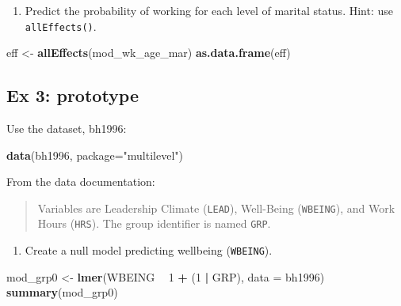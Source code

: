 \documentclass[]{book}
\newenvironment{Shaded}{\begin{snugshade}}{\end{snugshade}}
\newcommand{\KeywordTok}[1]{\textcolor[rgb]{0.13,0.29,0.53}{\textbf{#1}}}
\newcommand{\DataTypeTok}[1]{\textcolor[rgb]{0.13,0.29,0.53}{#1}}
\newcommand{\DecValTok}[1]{\textcolor[rgb]{0.00,0.00,0.81}{#1}}
\newcommand{\StringTok}[1]{\textcolor[rgb]{0.31,0.60,0.02}{#1}}
\newcommand{\OperatorTok}[1]{\textcolor[rgb]{0.81,0.36,0.00}{\textbf{#1}}}
\newcommand{\NormalTok}[1]{#1}
\providecommand{\tightlist}{%
  \setlength{\itemsep}{0pt}\setlength{\parskip}{0pt}}
\begin{document}
\begin{enumerate}
\def\labelenumi{\arabic{enumi}.}
\setcounter{enumi}{1}
\tightlist
\item
  Predict the probability of working for each level of marital status.
  Hint: use \texttt{allEffects()}.
\end{enumerate}

\begin{Shaded}
\begin{Highlighting}[]
\NormalTok{  eff <-}\StringTok{ }\KeywordTok{allEffects}\NormalTok{(mod_wk_age_mar)}
  \KeywordTok{as.data.frame}\NormalTok{(eff)}
\end{Highlighting}
\end{Shaded}

\subsection{Ex 3: prototype}\label{ex-3-prototype-1}

Use the dataset, bh1996:

\begin{Shaded}
\begin{Highlighting}[]
  \KeywordTok{data}\NormalTok{(bh1996, }\DataTypeTok{package=}\StringTok{"multilevel"}\NormalTok{)}
\end{Highlighting}
\end{Shaded}

From the data documentation:

\begin{quote}
Variables are Leadership Climate (\texttt{LEAD}), Well-Being
(\texttt{WBEING}), and Work Hours (\texttt{HRS}). The group identifier
is named \texttt{GRP}.
\end{quote}

\begin{enumerate}
\def\labelenumi{\arabic{enumi}.}
\tightlist
\item
  Create a null model predicting wellbeing (\texttt{WBEING}).
\end{enumerate}

\begin{Shaded}
\begin{Highlighting}[]
\NormalTok{  mod_grp0 <-}\StringTok{ }\KeywordTok{lmer}\NormalTok{(WBEING }\OperatorTok{~}\StringTok{ }\DecValTok{1} \OperatorTok{+}\StringTok{ }\NormalTok{(}\DecValTok{1} \OperatorTok{|}\StringTok{ }\NormalTok{GRP), }\DataTypeTok{data =}\NormalTok{ bh1996)}
  \KeywordTok{summary}\NormalTok{(mod_grp0)}
\end{Highlighting}
\end{Shaded}
\end{document}
